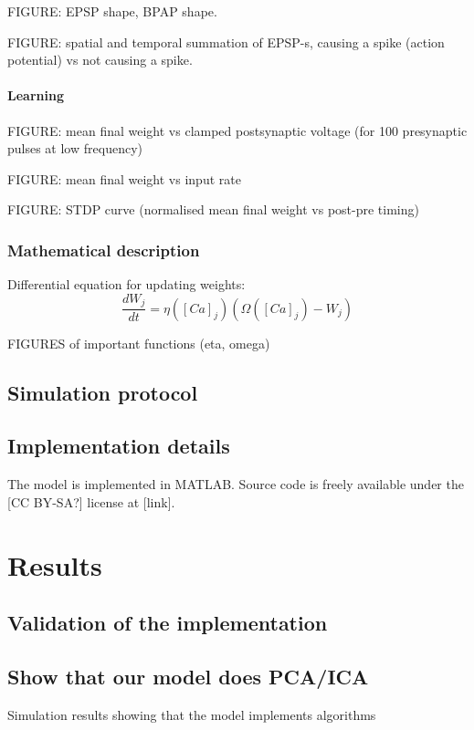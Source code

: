 \documentclass[a4paper,12pt]{report}
\theoremstyle{definition}
\begin{document}
FIGURE: EPSP shape, BPAP shape.

FIGURE: spatial and temporal summation of EPSP-s, causing a spike (action potential) vs not causing a spike.



\subsubsection{Learning}

FIGURE: mean final weight vs clamped postsynaptic voltage (for 100 presynaptic pulses at low frequency)

FIGURE: mean final weight vs input rate

FIGURE: STDP curve (normalised mean final weight vs post-pre timing)


\subsection{Mathematical description}

Differential equation for updating weights: $$ \frac{dW_j}{dt} = \eta ([Ca]_j) (\Omega([Ca]_j) - W_j)$$

FIGURES of important functions (eta, omega)


\section{Simulation protocol}




\section{Implementation details}

The model is implemented in MATLAB. Source code is freely available under the [CC BY-SA?] license at [link].


\chapter{Results}
\section{Validation of the implementation}

\section{Show that our model does PCA/ICA}
Simulation results showing that the model implements algorithms
\end{document}
